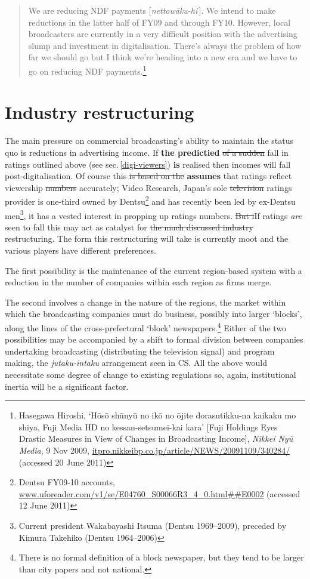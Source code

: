 \documentclass[11pt, oneside, a4paper, headsepline]{scrartcl}
\newcommand{\cjk}[1]{{\fontspec[Scale=0.9]{Hiragino Mincho Pro}#1}}
\begin{document}
\begin{quote}
We are reducing NDF payments [\emph{nettow\={a}ku-hi}\,]. We intend to make reductions in the latter half of FY09 and through FY10. However, local broadcasters are currently in a very difficult position with the advertising slump and investment in digitalisation. There's always the problem of how far we should go but I think we're heading into a new era and we have to go on reducing NDF payments.\footnote{Hasegawa Hiroshi, `H\={o}s\={o} sh\={u}ny\={u} no ik\={o} no \={o}jite dorasutikku-na kaikaku mo shiya, Fuji Media HD no kessan-setsumei-kai kara' [Fuji Holdings Eyes Drastic Measures in View of Changes in Broadcasting Income], \emph{Nikkei Ny\={u} Media}, 9 Nov 2009, \url{itpro.nikkeibp.co.jp/article/NEWS/20091109/340284/}  (accessed 20 June 2011)}%
\end{quote}

\section{Industry restructuring}

The main pressure on commercial broadcasting's ability to maintain the status quo is reductions in advertising income. If \textbf{the predictied} \st{of a sudden} fall in ratings outlined above (see sec.\,\ref{digi-viewers}) \textbf{is} realised then incomes will fall post-digitalisation. Of course this\st{ is based on the } \textbf{assumes} that ratings reflect viewership \st{numbers} accurately; Video Research, Japan's sole \st{television} ratings provider is one-third owned by Dentsu\footnote{Dentsu FY09-10 accounts, \url{www.uforeader.com/v1/se/E04760_S00066R3_4_0.html##E0002}  (accessed 12 June 2011)} and has recently been led by ex-Dentsu men\footnote{Current president Wakabayashi Itsuma (Dentsu 1969--2009), preceded by Kimura Takehiko (Dentsu 1964--2006)}, it has a vested interest in propping up ratings numbers. \st{But i}If ratings \emph{are} seen to fall this may act as catalyst for \st{the much discussed industry} restructuring. The form this restructuring will take is currently moot and the various players have different preferences.

The first possibility is the maintenance of the current region-based system with a reduction in the number of companies within each region as firms merge.

The second involves a change in the nature of the regions, the market within which the broadcasting companies must do business, possibly into larger `blocks', along the lines of the cross-prefectural `block' newspapers.\footnote{There is no formal definition of a block newspaper, but they tend to be larger than city papers and not national.}
Either of the two possibilities may be accompanied by a shift to formal division between companies undertaking broadcasting (distributing the television signal) and program making, the  \textit{jutaku-intaku} arrangement seen in CS. All the above would necessitate some degree of change to existing regulations so, again, institutional inertia will be a significant factor.%
\end{document}
